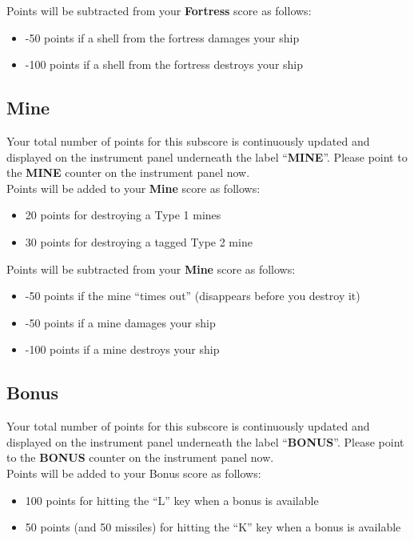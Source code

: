 \documentclass[letterpaper,12pt]{article}
\begin{document}
\noindent
Points will be subtracted from your \textbf{Fortress} score as follows:
\begin{itemize}
\item -50 points if a shell from the fortress damages your ship
\item -100 points if a shell from the fortress destroys your ship
\end{itemize}

\subsection{Mine}

Your total number of points for this subscore is continuously updated and displayed on
the instrument panel underneath the label ``\textbf{MINE}''. Please point to the \textbf{MINE}
counter on the instrument panel now.\\

\noindent
Points will be added to your \textbf{Mine} score as follows:
\begin{itemize}
\item 20 points for destroying a Type 1 mines
\item 30 points for destroying a tagged Type 2 mine
\end{itemize}

\noindent
Points will be subtracted from your \textbf{Mine} score as follows:
\begin{itemize}
\item -50 points if the mine ``times out'' (disappears before you destroy it)
\item -50 points if a mine damages your ship
\item -100 points if a mine destroys your ship
\end{itemize}

\subsection{Bonus}

Your total number of points for this subscore is continuously updated and displayed on
the instrument panel underneath the label ``\textbf{BONUS}''. Please point to the \textbf{BONUS}
counter on the instrument panel now.\\

\noindent
Points will be added to your Bonus score as follows:
\begin{itemize}
\item 100 points for hitting the ``L'' key when a bonus is available
\item 50 points (and 50 missiles) for hitting the ``K'' key when a bonus is available
\end{itemize}
\end{document}
